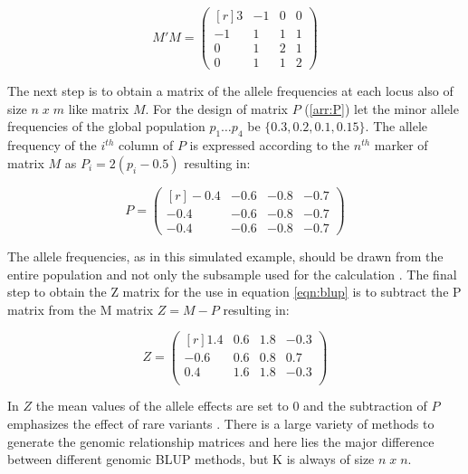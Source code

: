 \begin{equation}
 M'M = 
 \begin{pmatrix}[r]
  3 & -1 & 0 & 0 \\
  -1 & 1 & 1 & 1 \\
  0 & 1 & 2 & 1 \\
  0 & 1 & 1 & 2 
 \end{pmatrix}
 \label{arr:M'M}
\end{equation}

The next step is to obtain a matrix of the allele frequencies at each locus also of size
$n\; x\; m$ like matrix $M$. For the design of matrix $P$ (\ref{arr:P}) let the minor
allele frequencies of the global population $p_1 \dots p_4$ be $\{0.3, 0.2, 0.1, 0.15\}$. The allele frequency of
the $i^{th}$ column of $P$ is expressed according to the $n^{th}$ marker of matrix $M$ as
$P_i = 2(p_i - 0.5)$ resulting in:

\begin{equation}
 P = 
 \begin{pmatrix}[r]
  -0.4 & -0.6 & -0.8 & -0.7 \\
  -0.4 & -0.6 & -0.8 & -0.7 \\
  -0.4 & -0.6 & -0.8 & -0.7
 \end{pmatrix}
 \label{arr:P}
\end{equation}

The allele frequencies, as in this simulated example, should be drawn from the entire
population and not only the subsample used for the calculation
\cite{vanraden2008efficient}. The final step to obtain the Z matrix for the use in equation
\ref{eqn:blup} is to subtract the P matrix from the M matrix $Z= M - P$ resulting in:

\begin{equation}
 Z = 
 \begin{pmatrix}[r]
  1.4 & 0.6 & 1.8 & -0.3 \\
  -0.6 & 0.6 & 0.8 & 0.7 \\
  0.4 & 1.6 & 1.8 & -0.3 \\
 \end{pmatrix}
 \label{arr:Z}
\end{equation}

In $Z$ the mean values of the allele effects are set to 0 and the subtraction of $P$
emphasizes the effect of rare variants \cite{vanraden2008efficient}. There is a large
variety of methods to generate the genomic relationship matrices and here lies the major
difference between different genomic BLUP methods, but K is always of size $n\;x\;n$.


